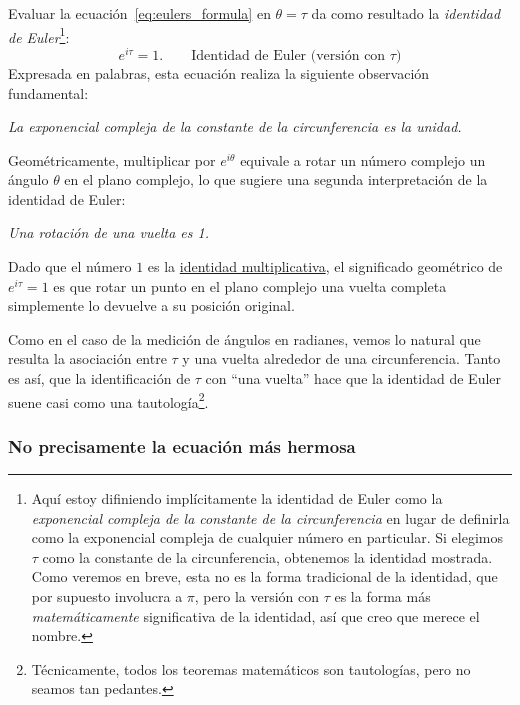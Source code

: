 Evaluar la ecuación~\eqref{eq:eulers_formula} en $\theta = \tau$ da como resultado la \emph{identidad de Euler}\footnote{Aquí estoy difiniendo implícitamente la identidad de Euler como la \emph{exponencial compleja de la constante de la circunferencia} en lugar de definirla como la exponencial compleja de cualquier número en particular. Si elegimos  $\tau$ como la constante de la circunferencia, obtenemos la identidad mostrada. Como veremos en breve, esta no es la forma tradicional de la identidad, que por supuesto involucra a $\pi$, pero la versión con  $\tau$ es la forma más  \emph{matemáticamente} significativa de la identidad, así que creo que merece el nombre.}:
\[ e^{i\tau} = 1. \qquad\mbox{Identidad de Euler (versión con $\tau$)} \]
Expresada en palabras, esta ecuación realiza la siguiente observación fundamental:

\begin{center}
\emph{La exponencial compleja de la constante de la circunferencia es la unidad.}
\end{center}

Geométricamente, multiplicar por $e^{i\theta}$ equivale a rotar un número complejo un ángulo $\theta$ en el plano complejo, lo que sugiere una segunda interpretación de la identidad de Euler:

\begin{center}
\emph{Una rotación de una vuelta es 1.}
\end{center}


\noindent Dado que el número $1$ es la \href{https://es.wikipedia.org/wiki/Elemento_neutro}{identidad multiplicativa}, el significado geométrico de $e^{i\tau} = 1$ es que rotar un punto en el plano complejo una vuelta completa simplemente lo devuelve a su posición original.

Como en el caso de la medición de ángulos en radianes, vemos lo natural que resulta la asociación entre $\tau$ y una vuelta alrededor de una circunferencia. Tanto es así, que la identificación de $\tau$ con ``una vuelta'' hace que la identidad de Euler suene casi como una tautología\footnote{Técnicamente, todos los teoremas matemáticos son tautologías, pero no seamos tan pedantes.}.


    \subsubsection{No precisamente la ecuación más hermosa} %
    \label{sec:not_the_most_beautiful_equation}

